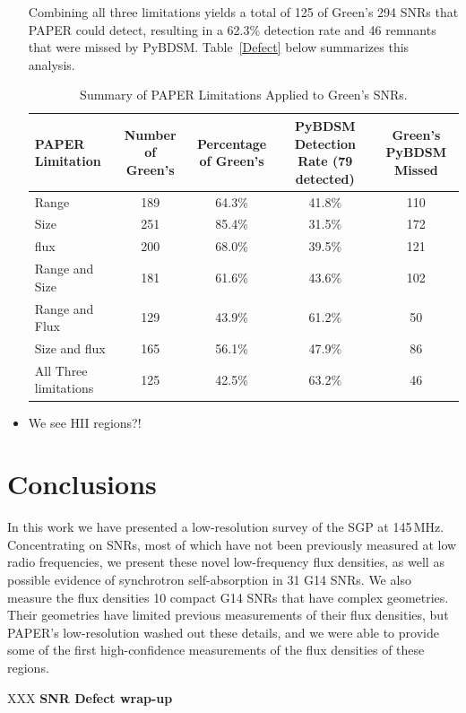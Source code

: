 \documentclass[useAMS,usenatbib]{mn2e}
\begin{document}
\begin{itemize}
Combining all three limitations yields a total of 125 of Green’s 294 SNRs that PAPER could detect, resulting in a 62.3\% detection rate and 46 remnants that were missed by PyBDSM.  Table~\ref{Defect} \Defect below summarizes this analysis. 

\begin{table}
\caption{Summary of PAPER Limitations Applied to Green's SNRs.}
\begin{tabular}{lcccc}
\hline
PAPER Limitation &	Number of Green’s &	Percentage of Green’s & PyBDSM Detection Rate (79 detected) & Green's PyBDSM Missed & \\
\hline
Range 					&	189	&	64.3\%	&	41.8\%	&	110 	\\
Size 					&	251	&	85.4\%	&	31.5\%	&	172		\\
flux 					&	200 &	68.0\% 	& 	39.5\%	&	121     \\
Range and Size 			&   181 &   61.6\%  &   43.6\%  &   102  	\\
Range and Flux 			&   129 &   43.9\%  &   61.2\%  &   50      \\
Size and flux   		&   165 &   56.1\%  &   47.9\%  &   86      \\
All Three limitations   &   125 &   42.5\%  &   63.2\%  &   46      \\
\hline
\end{tabular}
\label{tab:Defect}
\end{table}

\item We see HII regions?!
\end{itemize}

\section{Conclusions}
\label{sec:conc}

In this work we have presented a low-resolution survey of the SGP at 145\,MHz. Concentrating on SNRs, most of which have not been previously measured at low radio frequencies, we present these novel low-frequency flux densities, as well as possible evidence of synchrotron self-absorption in 31 G14 SNRs. We also measure the flux densities 10 compact G14 SNRs that have complex geometries. Their geometries have limited previous measurements of their flux densities, but PAPER's low-resolution washed out these details, and we were able to provide some of the first high-confidence measurements of the flux densities of these regions.

XXX {\bf SNR Defect wrap-up}
\end{document}
